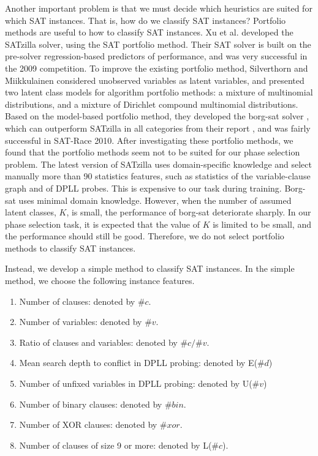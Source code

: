 \documentclass{llncs}
\begin{document}
Another important problem is that we must decide which heuristics
are suited for which SAT instances. That is, how do we classify SAT
instances? Portfolio methods are useful to how to classify SAT
instances. Xu et al. \cite {XuA:9,XuB:10} developed the SATzilla
solver, using the SAT portfolio method. Their SAT solver is built on
the pre-solver regression-based predictors of performance, and was
very successful in the 2009 competition. To improve the existing
portfolio method, Silverthorn and Miikkulainen \cite {Portfolio:8}
considered unobserved variables as latent variables, and presented
two latent class models for algorithm portfolio methods: a mixture
of multinomial distributions, and a mixture of Dirichlet compound
multinomial distributions. Based on the model-based portfolio
method, they developed the borg-sat solver \cite {borgsat:7}, which
can outperform SATzilla in all categories from their report \cite
{Portfolio:8}, and was fairly successful in SAT-Race 2010. After
investigating these portfolio methods, we found that the portfolio
methods seem not to be suited for our phase selection problem. The
latest version of SATzilla \cite {XuSovler:11} uses domain-specific
knowledge and select manually more than 90 statistics features, such
as statistics of the variable-clause graph and of DPLL probes. This
is expensive to our task during training. Borg-sat uses minimal
domain knowledge. However, when the number of assumed latent
classes, $K$, is small, the performance of borg-sat deteriorate
sharply. In our phase selection task, it is expected that the value
of $K$ is limited to be small, and the performance should still be
good. Therefore, we do not select portfolio methods to classify SAT
instances.

Instead, we develop a simple method to classify SAT instances. In
the simple method, we choose the following instance features.

\begin{enumerate}

\item Number of clauses: denoted by $\#c$.
\item Number of variables: denoted by $\#v$.
\item Ratio of clauses and variables: denoted by $\#c/\#v$.
\item Mean search depth to conflict in DPLL probing: denoted by E($\#d$)
\item Number of unfixed variables in DPLL probing: denoted by U($\#v$)
\item Number of binary clauses: denoted by $\#bin$.
\item Number of XOR clauses: denoted by $\#xor$.
\item Number of clauses of size 9 or more: denoted by L($\#c$).
\end{enumerate}
\end{document}
